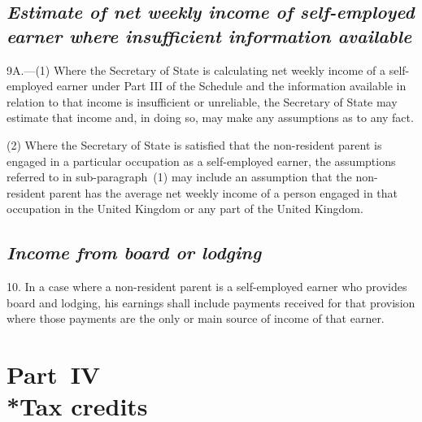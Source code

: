 \documentclass[12pt,a4paper]{article}
\begin{document}

\subsection*{\sloppy\itshape Estimate of net weekly income of self-\hspace{0pt}employed earner where insufficient information available}

9A.---(1)  Where the 
Secretary of State  %
is calculating net weekly income of a self-employed earner under Part III of the Schedule and the information available in relation to that income is insufficient or unreliable, the 
Secretary of State  %
may estimate that income and, in doing so, may make any assumptions as to any fact.

(2) Where the 
Secretary of State  %
is satisfied that the non-resident parent is engaged in a particular occupation as a self-employed earner, the assumptions referred to in sub-paragraph~(1) may include an assumption that the non-resident parent has the average net weekly income of a person engaged in that occupation in the United Kingdom or any part of the United Kingdom.


\subsection*{\itshape Income from board or lodging}

10.  In a case where a non-resident parent is a self-employed earner who provides board and lodging, his earnings shall include payments received for that provision where those payments are the only or main source of income of that earner.

\section[Part~IV --- Tax credits]{Part~IV\\*Tax credits}
\end{document}
